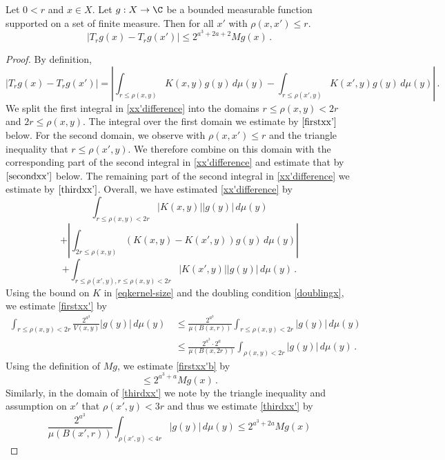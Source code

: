 \begin{lemma}
\label{estimate-x-shift}
Let $0<r$ and  $x\in X$. Let $g:X\to\C$ be a bounded measurable function supported on a set of finite measure.
Then for all $x'$ with $\rho(x,x')\le r$.
\begin{equation*}
\left| T_r g(x) - T_r g(x') \right|
\le 2^{a^3 + 2a + 2} Mg(x)\, .
\end{equation*}
\end{lemma}
\begin{proof}
By definition,
\begin{equation}
\label{xx'difference}
\left| T_r g(x) - T_r g(x') \right|
=\left|\int_{r\le\rho(x,y)} K(x,y) g(y) \,d\mu(y)
-\int_{r\le\rho(x',y)}
K(x',y) g(y)\, d\mu(y)
\right| \, .
\end{equation}
We split the first integral in \eqref{xx'difference}
into the domains $r\le\rho(x,y)<2r$
and $2r\le\rho(x,y)$. The integral over the first domain we estimate
by $\eqref{firstxx'}$ below.
For the second domain, we
observe with $\rho(x,x')\le r$ and the triangle inequality that $r\le\rho(x',y)$. We therefore combine on this domain with the
corresponding part of the second integral in \eqref{xx'difference} and estimate that by $\eqref{secondxx'}$
below. The remaining part of the second integral in
\eqref{xx'difference} we estimate by $\eqref{thirdxx'}$.
Overall, we have estimated \eqref{xx'difference} by
\begin{equation}
\label{firstxx'}
\int_{r\le\rho(x,y)< 2r} |K(x,y)| |g(y)| \,d\mu(y)
\end{equation}
\begin{equation}
\label{secondxx'}
  +  \left|\int_{2r\le\rho(x,y)} (K(x,y)-K(x',y)) g(y) \,d\mu(y)
\right|
\end{equation}
\begin{equation}
\label{thirdxx'}
  +\int_{r\le\rho(x',y), r\le\rho(x,y)<2r}
|K(x',y)| |g(y)|\, d\mu(y)\,.
\end{equation}
Using the bound on $K$ in \eqref{eqkernel-size} and the doubling condition \eqref{doublingx}, we estimate \eqref{firstxx'} by
\begin{align}
 \int_{r\le\rho(x,y)<2r} \frac{2^{a^3}}{V(x,y)} |g(y)| \,d\mu(y)\,
&\le
\frac{2^{a^3}}{\mu(B(x,r))} \int_{r\le\rho(x,y)<2r}
|g(y)| \, d\mu(y)\, \\
\label{firstxx'b}
&\le
\frac{2^{a^3} \cdot 2^a}{\mu(B(x,2r))} \int_{\rho(x,y)<2r}
|g(y)| \, d\mu(y)\,
.
\end{align}
Using the definition of $Mg$, we estimate
\eqref{firstxx'b} by
\begin{equation}
\label{firstxx'c}
 \le 2^{a^3 + a} {Mg(x)}\, .
\end{equation}
Similarly, in the domain of \eqref{thirdxx'}
we note by the triangle inequality
and assumption on $x'$ that $\rho(x',y)<3r$ and thus we estimate
\eqref{thirdxx'}
by
\begin{equation}
\label{thirdxx'b}
\frac{2^{a^3}}{\mu(B(x',r))} \int_{\rho(x',y)<4r}
|g(y)| \, d\mu(y)\le 2^{a^3 + 2a} Mg(x)
\end{equation}


\end{proof}
